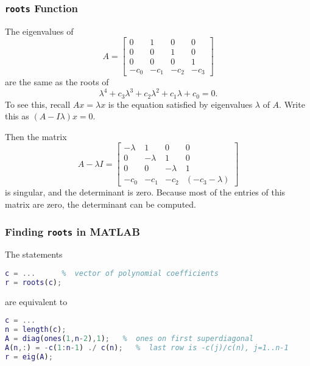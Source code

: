 \documentclass[10pt]{beamer}
\begin{document}
\begin{frame}
\frametitle{\texttt{roots} Function}

The eigenvalues of
\begin{equation*}
    A = \begin{bmatrix} 0 & 1 & 0 & 0 \\
                        0 & 0 & 1 & 0 \\
                        0 & 0 & 0 & 1 \\
                       -c_0 & -c_1 & -c_2 & -c_3 \end{bmatrix}
\end{equation*}
are the same as the roots of
\begin{equation*}
    \lambda^4 + c_3 \lambda^3 + c_2 \lambda^2 + c_1 \lambda + c_0 = 0.
\end{equation*}
To see this, recall $Ax = \lambda x$ is the equation satisfied by
eigenvalues $\lambda$ of $A$.  Write this as $(A - I\lambda)x = 0$.

Then the matrix
\begin{equation*}
    A -\lambda I= 
       \begin{bmatrix} -\lambda & 1 & 0 & 0 \\
                        0 & -\lambda & 1 & 0 \\
                        0 & 0 & -\lambda & 1 \\
                       -c_0 & -c_1 & -c_2 & (-c_3 - \lambda)\end{bmatrix}
\end{equation*}
is
singular, and the determinant is zero.  Because most of the entries of
this matrix are zero, the determinant can be computed.
\end{frame}
\begin{frame}
\frametitle{Finding \texttt{roots} in MATLAB}

\vspace{2ex}
The statements
\begin{lstlisting}[language=matlab]
c = ...      %  vector of polynomial coefficients
r = roots(c);
\end{lstlisting}
are equivalent to
\begin{lstlisting}[language=matlab]
c = ...
n = length(c);
A = diag(ones(1,n-2),1);   %  ones on first superdiagonal
A(n,:) = -c(1:n-1) ./ c(n);   %  last row is -c(j)/c(n), j=1..n-1
r = eig(A);
\end{lstlisting}

\end{frame}
\end{document}
